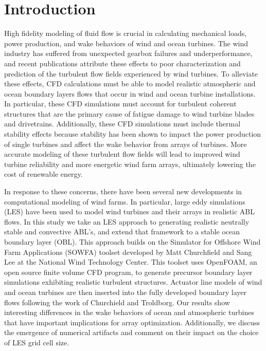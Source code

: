 \section{Introduction}
High fidelity modeling of fluid flow is crucial in calculating mechanical loads, power production, and wake behaviors of wind and ocean turbines.  The wind industry has suffered from unexpected gearbox failures and underperformance, and recent publications attribute these effects to poor characterization and prediction of the turbulent flow fields experienced by wind turbines.  To alleviate these effects, CFD calculations must be able to model realistic atmospheric and ocean boundary layers flows that occur in wind and ocean turbine installations.  In particular, these CFD simulations must account for turbulent coherent structures that are the primary cause of fatigue damage to wind turbine blades and drivetrains\cite{kelley_impact_2005,lee_atmospheric_2011}.  Additionally, these CFD simulations must include thermal stability effects because stability has been shown to impact the power production of single turbines and affect the wake behavior from arrays of turbines\cite{wharton_atmospheric_2012,wharton_assessing_2011}.  More accurate modeling of these turbulent flow fields will lead to improved wind turbine reliability and more energetic wind farm arrays, ultimately lowering the cost of renewable energy.

In response to these concerns, there have been several new developments in computational modeling of wind farms.  In particular, large eddy simulations (LES) have been used to  model wind turbines and their arrays in realistic ABL flows\cite{calaf_large_2010,lu_large-eddy_2011,porte-agel_large-eddy_201,wu_large-eddy_2010,sanderse_review_2011}.  In this study we take an LES approach to generating realistic neutrally stable and convective ABL's, and extend that framework to a stable ocean boundary layer (OBL).  This approach builds on the Simulator for Offshore Wind Farm Applications (SOWFA) toolset developed by Matt Churchfield and Sang Lee at the National Wind Technology Center\cite{SOWFA}.  This toolset uses OpenFOAM, an open source finite volume CFD program\cite{OpenFOAM}, to generate precursor boundary layer simulations exhibiting realistic turbulent structures.  Actuator line models of wind and ocean turbines are then inserted into the fully developed boundary layer flows following the work of Churchield and Troldborg\cite{churchfield_large-eddy_2012,churchfield_numerical_2012,troldborg_actuator_2007}.  Our results show interesting differences in the wake behaviors of ocean and atmospheric turbines that have important implications for array optimization.  Additionally, we discuss the emergence of numerical artifacts and comment on their impact on the choice of LES grid cell size.
